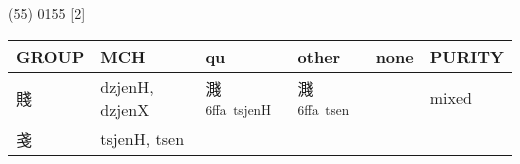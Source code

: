 \documentclass[14pt,a4paper]{scrartcl}
\begin{document}
(55) 0155 {[}2{]}

\begin{longtable}[c]{@{}llllll@{}}
\toprule
\begin{minipage}[b]{0.14\columnwidth}\raggedright\strut
GROUP
\strut\end{minipage} &
\begin{minipage}[b]{0.14\columnwidth}\raggedright\strut
MCH
\strut\end{minipage} &
\begin{minipage}[b]{0.14\columnwidth}\raggedright\strut
qu
\strut\end{minipage} &
\begin{minipage}[b]{0.14\columnwidth}\raggedright\strut
other
\strut\end{minipage} &
\begin{minipage}[b]{0.14\columnwidth}\raggedright\strut
none
\strut\end{minipage} &
\begin{minipage}[b]{0.14\columnwidth}\raggedright\strut
PURITY
\strut\end{minipage}\tabularnewline
\midrule
\endhead
\begin{minipage}[t]{0.14\columnwidth}\raggedright\strut
賤
\strut\end{minipage} &
\begin{minipage}[t]{0.14\columnwidth}\raggedright\strut
dzjenH, dzjenX
\strut\end{minipage} &
\begin{minipage}[t]{0.14\columnwidth}\raggedright\strut
濺\textsuperscript{6ffa~tsjenH}
\strut\end{minipage} &
\begin{minipage}[t]{0.14\columnwidth}\raggedright\strut
濺\textsuperscript{6ffa~tsen}
\strut\end{minipage} &
\begin{minipage}[t]{0.14\columnwidth}\raggedright\strut
\strut\end{minipage} &
\begin{minipage}[t]{0.14\columnwidth}\raggedright\strut
mixed
\strut\end{minipage}\tabularnewline
\begin{minipage}[t]{0.14\columnwidth}\raggedright\strut
戔
\strut\end{minipage} &
\begin{minipage}[t]{0.14\columnwidth}\raggedright\strut
tsjenH, tsen
\strut\end{minipage} &
\begin{minipage}[t]{0.14\columnwidth}\raggedright\strut

\end{minipage}
\end{longtable}
\end{document}
